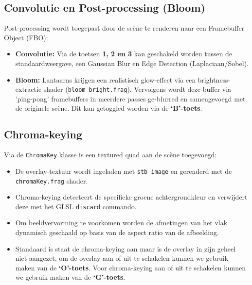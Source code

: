 \documentclass[11pt,a4paper]{article}
\begin{document}
\subsection{Convolutie en Post-processing (Bloom)}
Post-processing wordt toegepast door de scène te renderen naar een Framebuffer Object (FBO):
\begin{itemize}
	\item \textbf{Convolutie:} Via de toetsen \textbf{1, 2 en 3} kan geschakeld worden tussen de standaardweergave, een Gaussian Blur en Edge Detection (Laplaciaan/Sobel).
	\item \textbf{Bloom:} Lantaarns krijgen een realistisch glow-effect via een brightness-extractie shader (\texttt{bloom\_bright.frag}). Vervolgens wordt deze buffer via 'ping-pong' framebuffers in meerdere passes ge-blurred en samengevoegd met de originele scène. Dit kan getoggled worden via de \textbf{`B'-toets}.
\end{itemize}

\subsection{Chroma-keying}
Via de \texttt{ChromaKey} klasse is een textured quad aan de scène toegevoegd:
\begin{itemize}
	\item De overlay-textuur wordt ingeladen met \texttt{stb\_image} en gerenderd met de \texttt{chromaKey.frag} shader.
	\item Chroma-keying detecteert de specifieke groene achtergrondkleur en verwijdert deze met het GLSL \texttt{discard} commando.
	\item Om beeldvervorming te voorkomen worden de afmetingen van het vlak dynamisch geschaald op basis van de aspect ratio van de afbeelding.
	\item Standaard is staat de chroma-keying aan maar is de overlay in zijn geheel niet aangezet, om de overlay aan of uit te schakelen kunnen we gebruik maken van de \textbf{`O'-toets}. Voor chroma-keying aan of uit te schakelen kunnen we gebruik maken van de \textbf{`G'-toets}.
\end{itemize}
\end{document}
